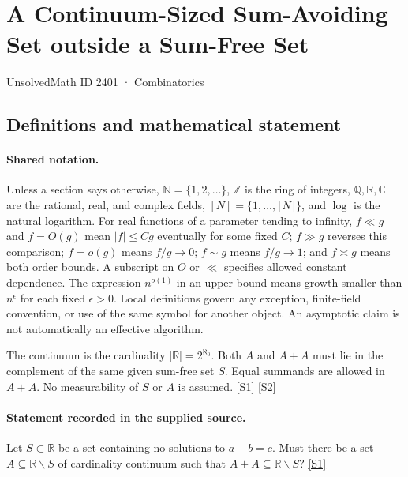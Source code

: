 \documentclass[11pt,a4paper]{article}
\newcommand{\N}{\mathbb{N}}
\newcommand{\Z}{\mathbb{Z}}
\newcommand{\Q}{\mathbb{Q}}
\newcommand{\R}{\mathbb{R}}
\newcommand{\C}{\mathbb{C}}
\newcommand{\sref}[2]{\hyperlink{source:#1:#2}{[S#2]}}
\begin{document}

\setcounter{section}{2400}

\section{A Continuum-Sized Sum-Avoiding Set outside a Sum-Free Set}\label{2401}

{\small\sffamily UnsolvedMath ID 2401 · Combinatorics}

\subsection{Definitions and mathematical statement}

\paragraph{Shared notation.}Unless a section says otherwise, $\N=\{1,2,\ldots\}$,
$\Z$ is the ring of integers, $\Q,\R,\C$ are the rational, real, and complex
fields, $[N]=\{1,\ldots,\lfloor N\rfloor\}$, and $\log$ is the natural
logarithm. For real functions of a parameter tending to infinity,
$f\ll g$ and $f=O(g)$ mean $|f|\leq Cg$ eventually for some fixed $C$;
$f\gg g$ reverses this comparison; $f=o(g)$ means $f/g\to0$;
$f\sim g$ means $f/g\to1$; and $f\asymp g$ means both order bounds.
A subscript on $O$ or $\ll$ specifies allowed constant dependence.
The expression $n^{o(1)}$ in an upper bound means growth smaller than
$n^\epsilon$ for each fixed $\epsilon>0$. Local definitions govern any
exception, finite-field convention, or use of the same symbol for another
object. An asymptotic claim is not automatically an effective algorithm.



The continuum is the cardinality $|\R|=2^{\aleph_0}$. Both $A$ and $A+A$ must lie in the complement of the same given sum-free set $S$. Equal summands are allowed in $A+A$. No measurability of $S$ or $A$ is assumed. \sref{2401}{1} \sref{2401}{2}

\paragraph{Statement recorded in the supplied source.}
Let $S\subset \mathbb{R}$ be a set containing no solutions to $a+b=c$. Must there be a set $A\subseteq \mathbb{R}\backslash S$ of cardinality continuum such that $A+A\subseteq \mathbb{R}\backslash S$? \sref{2401}{1}
\end{document}
